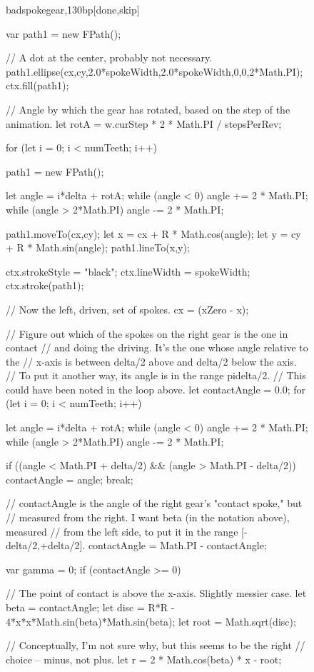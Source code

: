 \documentclass[10pt]{article}
\begin{document}
\begin{figure}
\begin{figput}{badspokegear,130bp}[done,skip]
{  var path1 = new FPath();
  
  // A dot at the center, probably not necessary.
  path1.ellipse(cx,cy,2.0*spokeWidth,2.0*spokeWidth,0,0,2*Math.PI);
  ctx.fill(path1);
  
  // Angle by which the gear has rotated, based on the step of the animation.
  let rotA = w.curStep * 2 * Math.PI / stepsPerRev;
  
  for (let i = 0; i < numTeeth; i++)
    { 
      path1 = new FPath();
      
      let angle = i*delta + rotA;
      while (angle < 0)
        angle += 2 * Math.PI;
      while (angle > 2*Math.PI)
        angle -= 2 * Math.PI;
      
      path1.moveTo(cx,cy);
      let x = cx + R * Math.cos(angle);
      let y = cy + R * Math.sin(angle);
      path1.lineTo(x,y);
      
      ctx.strokeStyle = "black";
      ctx.lineWidth = spokeWidth;
      ctx.stroke(path1);
    }
  
  // Now the left, driven, set of spokes.
  cx = (xZero - x);
  
  // Figure out which of the spokes on the right gear is the one in contact
  // and doing the driving. It's the one whose angle relative to the 
  // x-axis is between delta/2 above and delta/2 below the axis.
  // To put it another way, its angle is in the range pi\pm delta/2.
  // This could have been noted in the loop above.
  let contactAngle = 0.0;
  for (let i = 0; i < numTeeth; i++)
    {
      let angle = i*delta + rotA;
      while (angle < 0)
        angle += 2 * Math.PI;
      while (angle > 2*Math.PI)
        angle -= 2 * Math.PI;
           
      if ((angle < Math.PI + delta/2) && (angle > Math.PI - delta/2))
        {
          contactAngle = angle;
          break;
        }
    }
  
  // contactAngle is the angle of the right gear's "contact spoke," but
  // measured from the right. I want beta (in the notation above), measured
  // from the left side, to put it in the range [-delta/2,+delta/2].
  contactAngle = Math.PI - contactAngle;
  
  var gamma = 0;
  if (contactAngle >= 0)
    {
      // The point of contact is above the x-axis. Slightly messier case.
      let beta = contactAngle;
      let disc = R*R - 4*x*x*Math.sin(beta)*Math.sin(beta);
      let root = Math.sqrt(disc);
      
      // Conceptually, I'm not sure why, but this seems to be the right
      // choice -- minus, not plus.
      let r = 2 * Math.cos(beta) * x - root;
      
}}
\end{figput}
\end{figure}
\end{document}
